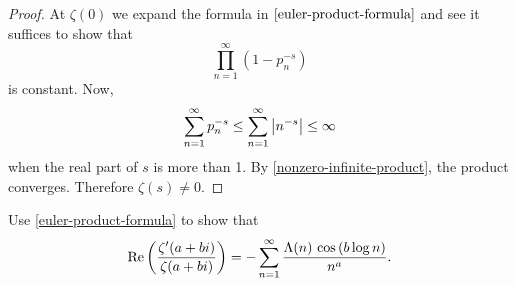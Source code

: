 \documentclass{homework}
\begin{document}
                                                                                        \begin{proof}
                                                                                        At $\zeta(0)$ we expand the formula in $\ref{euler-product-formula}$ and see it suffices to show that
                                                                                        \[
                                                                                        \prod_{n=1}^\infty (1- p_n^{-s})
                                                                                        \]
                                                                                        is constant. Now, 
                                                                                        \[
                                                                                        \sum_{n=1}^\infty p_n^{-s} \leq \sum_{n=1}^\infty \left|n^{-s}\right| \leq \infty
                                                                                        \]
                                                                                        when the real part of $s$ is more than 1. By \ref{nonzero-infinite-product}, the product converges. Therefore $\zeta(s)\neq 0$.
                                                                                        \end{proof}
                                                                                        \begin{problem}
                                                                                          Use \ref{euler-product-formula} to show that
                                                                                            \[
                                                                                                \operatorname{Re} \left( \frac{ \zeta'(a+bi) }{ \zeta(a+bi) } \right) = - \sum_{n=1}^\infty \frac{\Lambda(n) \, \cos \left( b \log n \right)}{n^{a}}.
                                                                                                  \]
                                                                                                  \end{problem}
\end{document}
